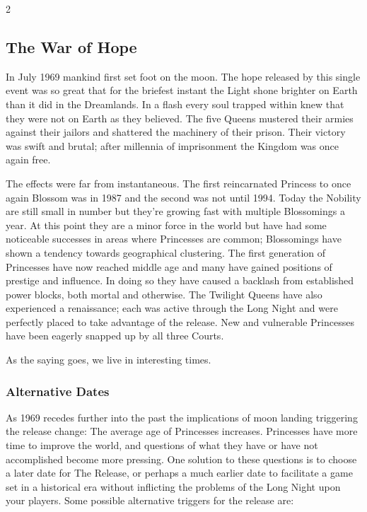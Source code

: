 \begin{multicols}{2}
\subsection*{The War of Hope}%

In July 1969 mankind first set foot on the moon. The hope released by this single event was so great that for the briefest instant the Light shone brighter on Earth than it did in the Dreamlands. In a flash every soul trapped within knew that they were not on Earth as they believed. The five Queens mustered their armies against their jailors and shattered the machinery of their prison. Their victory was swift and brutal; after millennia of imprisonment the Kingdom was once again free. 

The effects were far from instantaneous. The first reincarnated Princess to once again Blossom was in 1987 and the second was not until 1994. Today the Nobility are still small in number but they're growing fast with multiple Blossomings a year. At this point they are a minor force in the world but have had some noticeable successes in areas where Princesses are common; Blossomings have shown a tendency towards geographical clustering. The first generation of Princesses have now reached middle age and many have gained positions of prestige and influence. In doing so they have caused a backlash from established power blocks, both mortal and otherwise. The Twilight Queens have also experienced a renaissance; each was active through the Long Night and were perfectly placed to take advantage of the release. New and vulnerable Princesses have been eagerly snapped up by all three Courts. 

As the saying goes, we live in interesting times. 

\bigsidebarstart

\subsubsection*{Alternative Dates}
As 1969 recedes further into the past the implications of moon landing triggering the release change: The average age of Princesses increases. Princesses have more time to improve the world, and questions of what they have or have not accomplished become more pressing. One solution to these questions is to choose a later date for The Release, or perhaps a much earlier date to facilitate a game set in a historical era without inflicting the problems of the Long Night upon your players. Some possible alternative triggers for the release are: \\


\end{multicols}
